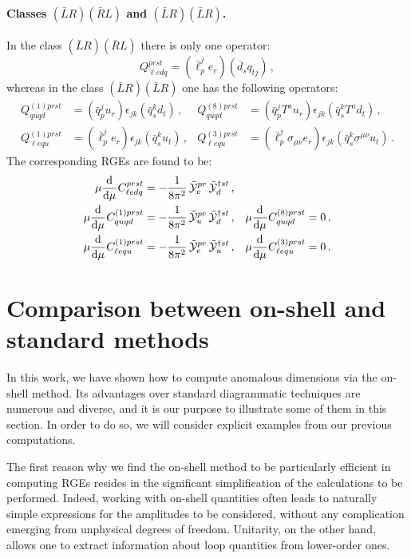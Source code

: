 \paragraph{Classes $(\bar{L}R)(\bar{R}L)$ and $(\bar{L}R)(\bar{L}R)$.}

In the class $(\bar{L}R)(\bar{R}L)$ there is only one operator: 
%
\begin{equation}
Q_{\ell e dq}^{prst} = (\bar{\ell}_p^j e_r)(\bar{d}_sq_{tj})\,,
\end{equation}
whereas in the class $(\bar{L}R)(\bar{L}R)$ one has the following operators:
\begin{align}
Q^{(1)prst}_{quqd}&=(\bar{q}_p^j u_r)\epsilon_{jk}(\bar{q}_s^k d_t)\,,  &Q^{(8)prst}_{quqd}&=(\bar{q}_p^j T^au_r)\epsilon_{jk}(\bar{q}_s^k T^a d_t)\,, \\
Q^{(1)prst}_{\ell equ}&=(\bar{\ell}_p^j e_r)\epsilon_{jk}(\bar{q}_s^k u_t)\,,  &Q^{(3)prst}_{\ell equ}&=(\bar{\ell}_p^j \sigma_{\mu\nu}e_r)\epsilon_{jk}(\bar{q}_s^k \sigma^{\mu\nu} u_t) \,.
\end{align}
The corresponding RGEs are found to be:
\begin{align}
\mu\dv[]{}{\mu}{C}_{\ell edq}^{prst} &= -\frac{1}{8\pi^2}\,\tilde{\mathcal{Y}}_e^{pr}\,\tilde{\mathcal{Y}}_d^{\dagger st} \, ,  && \\
\mu\dv[]{}{\mu}{C}_{quqd}^{(1)prst} &=-\frac{1}{8\pi^2}\,\tilde{\mathcal{Y}}_u^{pr}\,\tilde{\mathcal{Y}}_d^{\dagger st} \, ,  &
\mu\dv[]{}{\mu}{C}_{quqd}^{(8)prst} &=0\, ,  \\
\mu\dv[]{}{\mu}{C}_{\ell equ}^{(1)prst} &= -\frac{1}{8\pi^2}\,\tilde{\mathcal{Y}}_e^{pr}\,\tilde{\mathcal{Y}}_u^{\dagger st} \, ,  &
\mu\dv[]{}{\mu}{C}_{\ell equ}^{(3)prst} &=0\, . 
\end{align}

\section{Comparison between on-shell and standard methods}\label{sec:comparison}

In this work, we have shown how to compute anomalous dimensions via the on-shell method.
Its advantages over standard diagrammatic techniques are numerous and diverse, and it is our purpose to illustrate some of them in this section.
In order to do so, we will consider explicit examples from our previous computations. 

The first reason why we find the on-shell method to be particularly efficient in computing RGEs resides in the significant simplification of the calculations to be performed.
Indeed, working with on-shell quantities often leads to naturally simple expressions for the amplitudes to be considered, without any complication emerging from unphysical degrees of freedom.
Unitarity, on the other hand, allows one to extract information about loop quantities from lower-order ones.

